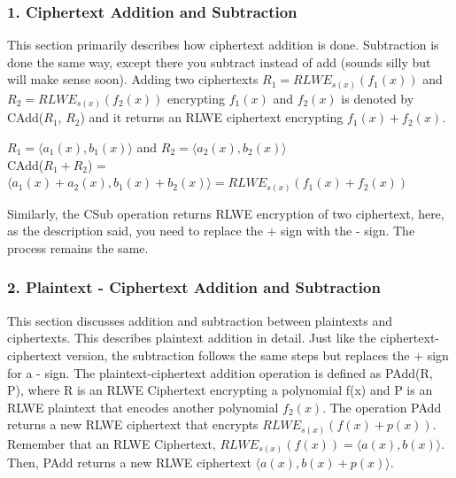 \documentclass{report}
\begin{document}
		\subsubsection{1. Ciphertext Addition and Subtraction}
			This section primarily describes how ciphertext addition is done. Subtraction is done the same way, except there you subtract instead of add (sounds silly but will make sense soon). Adding two ciphertexts $R_1 = RLWE_{s(x)}(f_1(x))$ and $R_2 = RLWE_{s(x)}(f_2(x))$ encrypting $f_1(x)$ and $f_2(x)$ is denoted by CAdd($R_1$, $R_2$) and it returns an RLWE ciphertext encrypting $f_1(x) + f_2(x)$.
			\begin{center}
				$R_1 = \langle a_1(x), b_1(x) \rangle$ and $R_2 = \langle a_2(x), b_2(x) \rangle$\\
				CAdd($R_1 + R_2$) = $\langle a_1(x) + a_2(x), b_1(x) + b_2(x) \rangle = RLWE_{s(x)} (f_1(x) + f_2(x))$
			\end{center}
			
			Similarly, the CSub operation returns RLWE encryption of two ciphertext, here, as the description said, you need to replace the + sign with the - sign. The process remains the same.
			
		\subsubsection{2. Plaintext - Ciphertext Addition and Subtraction}
		This section discusses addition and subtraction between plaintexts and ciphertexts. This describes plaintext addition in detail. Just like the ciphertext-ciphertext version, the subtraction follows the same steps but replaces the + sign for a - sign. The plaintext-ciphertext addition operation is defined as PAdd(R, P), where R is an RLWE Ciphertext encrypting a polynomial f(x) and P is an RLWE plaintext that encodes another polynomial $f_2(x)$. The operation PAdd returns a new RLWE ciphertext that encrypts $RLWE_{s(x)}(f(x) + p(x))$. Remember that an RLWE Ciphertext, $RLWE_{s(x)}(f(x)) = \langle a(x), b(x) \rangle$. Then, PAdd returns a new RLWE ciphertext $\langle a(x), b(x) + p(x) \rangle$.
		
\end{document}
